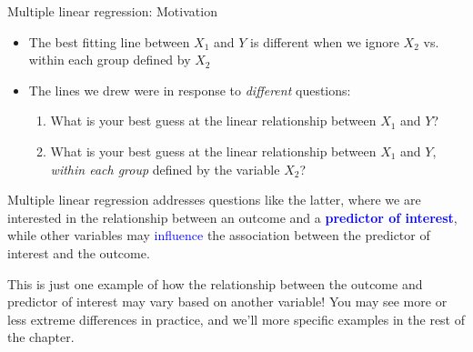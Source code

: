 \documentclass[10pt,t]{beamer}
\begin{document}
\begin{frame}{Multiple linear regression: Motivation}
\begin{itemize}
	\item The best fitting line between $X_1$ and $Y$ is different when we ignore $X_2$ vs. within each group defined by $X_2$
	\medskip
	
	\item The lines we drew were in response to \textit{different} questions:
	\begin{enumerate}
		\medskip
		\item What is your best guess at the linear relationship between $X_1$ and $Y$?
		\medskip
		\item What is your best guess at the linear relationship between $X_1$ and $Y$, \textit{within each group} defined by the variable $X_2$? 
	\end{enumerate}
\end{itemize}

\vspace{0.3cm}

Multiple linear regression addresses questions like the latter, where we are interested in the relationship between an outcome and a \textbf{\textcolor{blue}{predictor of interest}}, while other variables may \textcolor{blue}{influence} the association between the predictor of interest and the outcome. \pause

\vspace{0.3cm}

This is just one example of how the relationship between the outcome and predictor of interest may vary based on another variable! You may see more or less extreme differences in practice, and we'll more specific examples in the rest of the chapter.
\end{frame}
\end{document}
